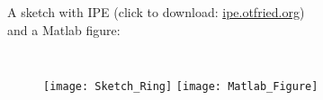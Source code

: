 


\begin{frame}
	A sketch with IPE (click to download: \href{http://ipe.otfried.org/}{ipe.otfried.org}) \\ and a Matlab figure:
	\vspace{-4mm}
	\begin{columns}
	\column{\dimexpr\paperwidth}
	\begin{figure}%
	    \texttt{[image: Sketch\_Ring]}%
	           \hspace{\dimexpr0.02\textwidth}%
	    \texttt{[image: Matlab\_Figure]}%
	\end{figure}%
	\end{columns}
\end{frame}

